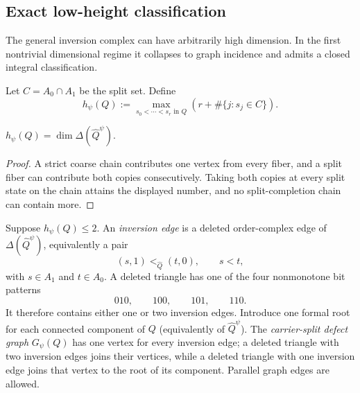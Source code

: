 \subsection{Exact low-height classification}

The general inversion complex can have arbitrarily high dimension.  In the first
nontrivial dimensional regime it collapses to graph incidence and admits a closed
integral classification.

\begin{definition}
Let $C=A_0\cap A_1$ be the split set.  Define
\[
 h_\psi(Q)
 :=\max_{s_0<\cdots<s_r\text{ in }Q}
 \left(r+\#\{j:s_j\in C\}\right).
\]
\end{definition}

\begin{lemma}\label{lem:split-height}
$h_\psi(Q)=\dim\Delta(\widehat Q^\psi)$.
\end{lemma}
\begin{proof}
A strict coarse chain contributes one vertex from every fiber, and a split fiber can
contribute both copies consecutively.  Taking both copies at every split state on the
chain attains the displayed number, and no split-completion chain can contain more.
\end{proof}

Suppose $h_\psi(Q)\leq2$.  An \emph{inversion edge} is a deleted order-complex edge
of $\Delta(\widehat Q^\psi)$, equivalently a pair
\[
 (s,1)<_{\widehat Q}(t,0),\qquad s<t,
\]
with $s\in A_1$ and $t\in A_0$.  A deleted triangle has one of the four nonmonotone
bit patterns
\[
 010,\qquad100,\qquad101,\qquad110.
\]
It therefore contains either one or two inversion edges.  Introduce one formal root
for each connected component of $Q$ (equivalently of $\widehat Q^\psi$).  The
\emph{carrier-split defect graph} $G_\psi(Q)$ has one vertex for every inversion edge;
a deleted triangle with two inversion edges joins their vertices, while a deleted
triangle with one inversion edge joins that vertex to the root of its component.
Parallel graph edges are allowed.

